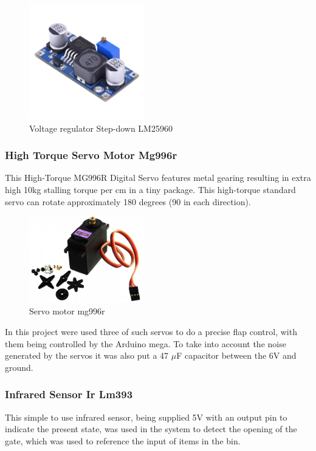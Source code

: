 \documentclass[a4paper,11pt]{article}
\begin{document}
\begin{figure}[H]
  \centering
  \includegraphics[width=5cm]{Figures/voltageRegulator.jpg}
  \caption{\small{Voltage regulator Step-down LM25960}}
  \label{fig:VoltageRegulator}
\end{figure}

\subsubsection{High Torque Servo Motor Mg996r}
This High-Torque MG996R Digital Servo features metal gearing resulting in extra high 10kg stalling torque per cm in a tiny package. This high-torque standard servo can rotate approximately 180 degrees (90 in each direction). \cite{servo}

\begin{figure}[H]
  \centering
  \includegraphics[width=5cm]{Figures/servo-motor-mg996r-tower-pro-360-11kgcm-rotacao-continua-com-engrenagens-metalicas.jpg}
  \caption{\small{Servo motor mg996r}}
  \label{fig:servo}
\end{figure}

In this project were used three of such servos to do a precise flap control, with them being controlled by the Arduino mega. To take into account the noise generated by the servos it was also put a 47 $\mu$F capacitor between the 6V and ground.

\subsubsection{Infrared Sensor Ir Lm393}
This simple to use infrared sensor, being supplied 5V with an output pin to indicate the present state, was used in the system to detect the opening of the gate, which was used to reference the input of items in the bin.
\end{document}
